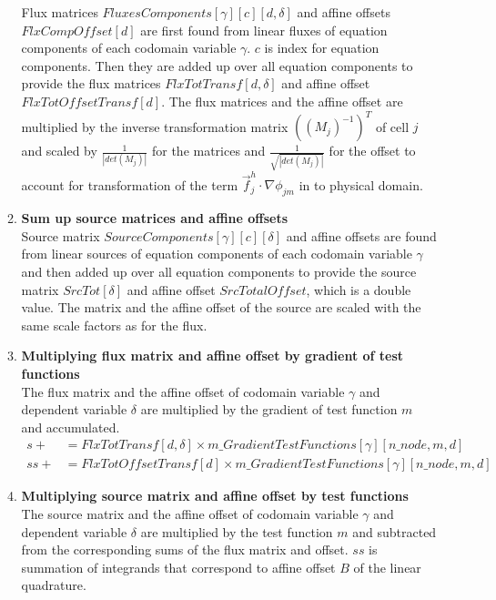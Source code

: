\documentclass[BoSSSForSolvingConservationLaws.tex]{subfiles}
\begin{document}
\begin{itemize}
\begin{enumerate}
Flux matrices $FluxesComponents[\gamma][c][d,\delta]$ and affine offsets $FlxCompOffset[d]$ are first found from linear fluxes of equation components of each codomain variable $\gamma$. $c$ is index for equation components. Then they are added up over all equation components to provide the flux matrices $FlxTotTransf[d,\delta]$ and affine offset $FlxTotOffsetTransf[d]$. The flux matrices and the affine offset are multiplied by the inverse transformation matrix $((M_j)^{-1})^T$ of cell $j$ and scaled by $\frac{1}{|det(M_j)|}$ for the matrices and $\frac{1}{\sqrt{|det(M_j)|}}$ for the offset to account for transformation of the term $\vec{f}_j^h\cdot \nabla \phi_{jm}$ in to physical domain.
\item \textbf{Sum up source matrices and affine offsets}\\
Source matrix $SourceComponents[\gamma][c][\delta]$ and affine offsets are found from linear sources of equation components of each codomain variable $\gamma$ and then added up over all equation components to provide the source matrix $SrcTot[\delta]$ and affine offset $SrcTotalOffset$, which is a double value. The matrix and the affine offset of the source are scaled with the same scale factors as for the flux.
\item \textbf{Multiplying flux matrix and affine offset by gradient of test functions}\\
The flux matrix and the affine offset of codomain variable $\gamma$ and dependent variable $\delta$ are multiplied by the gradient of test function $m$ and accumulated.
\begin{align*}
s+&=FlxTotTransf[d,\delta] \times m\_GradientTestFunctions[\gamma][n\_node, m, d]\\
ss+&=FlxTotOffsetTransf[d] \times m\_GradientTestFunctions[\gamma][n\_node, m, d]
\end{align*}
\item \textbf{Multiplying source matrix and affine offset by test functions}\\
The source matrix and the affine offset of codomain variable $\gamma$ and dependent variable $\delta$ are multiplied by the test function $m$ and subtracted from the corresponding sums of the flux matrix and offset. $ss$ is summation of integrands that correspond to affine offset $B$ of the linear quadrature.

\end{enumerate}
\end{itemize}
\end{document}
